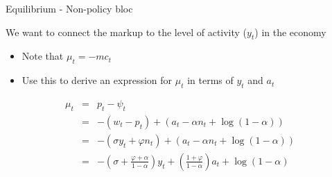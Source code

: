 \documentclass{beamer}
\begin{document}
\begin{frame}{Equilibrium - Non-policy bloc}

We want to connect the markup to the level of activity ($y_{t}$) in the economy
\begin{itemize}
\item	Note that $\mu_{t}=-mc_{t}$
\item	Use this to derive an expression for $\mu_{t}$ in terms of $y_{t}$ and $a_{t}$
\end{itemize}
\begin{eqnarray*}
\mu_{t} &=& p_{t} - \psi_{t}	\\
		&=& -(w_{t} - p_{t}) + (a_{t} - \alpha n_{t} + \log{(1-\alpha)}) \\
		&=& -(\sigma y_{t} + \varphi n_{t}) + (a_{t} - \alpha n_{t} + \log{(1-\alpha)}) \\
		&=& - \left( \sigma + \frac{\varphi + \alpha}{1-\alpha} \right)y_{t} + \left( \frac{1+\varphi}{1-\alpha} \right)a_{t}+ \log{(1-\alpha)}
\end{eqnarray*}


\end{frame}


	
\end{document}
